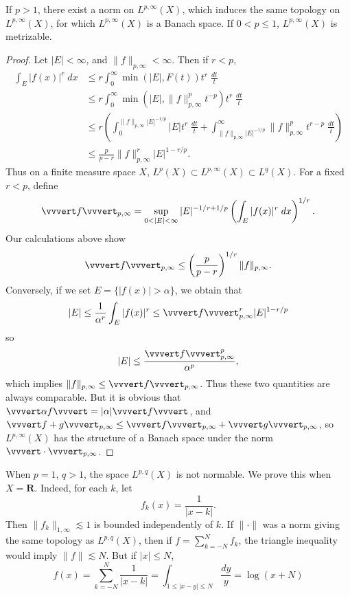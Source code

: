 \begin{theorem}
    If $p > 1$, there exist a norm on $L^{p,\infty}(X)$, which induces the same topology on $L^{p,\infty}(X)$, for which $L^{p,\infty}(X)$ is a Banach space. If $0 < p \leq 1$, $L^{p,\infty}(X)$ is metrizable.
\end{theorem}
\begin{proof}
    Let $|E| < \infty$, and $\| f \|_{p,\infty} < \infty$. Then if $r < p$,
    \begin{align*}
        \int_E |f(x)|^r\; dx &\leq r \int_0^\infty \min(|E|, F(t)) t^r\; \frac{dt}{t}\\
        &\leq r \int_0^\infty \min(|E|, \| f \|_{p,\infty}^p t^{-p} ) t^r\; \frac{dt}{t}\\
        &\leq r \left( \int_0^{\| f \|_{p,\infty} |E|^{-1/p}} |E| t^r\; \frac{dt}{t} + \int_{\| f \|_{p,\infty} |E|^{-1/p}}^\infty \| f \|_{p,\infty}^p t^{r-p}\; \frac{dt}{t} \right)\\
        &\leq \frac{p}{p - r} \| f \|_{p,\infty}^r |E|^{1-r/p}.
    \end{align*}
    Thus on a finite measure space $X$, $L^p(X) \subset L^{p,\infty}(X) \subset L^q(X)$. For a fixed $r < p$, define
    \[ \vvvert f \vvvert_{p,\infty} = \sup_{0 < |E| < \infty} |E|^{-1/r + 1/p} \left( \int_E |f(x)|^r\; dx \right)^{1/r}. \]
    Our calculations above show
    \[ \vvvert f \vvvert_{p,\infty} \leq \left( \frac{p}{p-r} \right)^{1/r} \| f \|_{p,\infty}. \]
    Conversely, if we set $E = \{ |f(x)| > \alpha \}$, we obtain that
    \[ |E| \leq \frac{1}{\alpha^r} \int_E |f(x)|^r \leq \vvvert f \vvvert_{p,\infty}^r |E|^{1 - r/p} \]
    so
    \[ |E| \leq \frac{\vvvert f \vvvert_{p,\infty}^p}{\alpha^p}, \]
    which implies $\| f \|_{p,\infty} \leq \vvvert f \vvvert_{p,\infty}$. Thus these two quantities are always comparable. But it is obvious that $\vvvert \alpha f \vvvert = |\alpha| \vvvert f \vvvert$, and $\vvvert f + g \vvvert_{p,\infty} \leq \vvvert f \vvvert_{p,\infty} + \vvvert g \vvvert_{p,\infty}$, so $L^{p,\infty}(X)$ has the structure of a Banach space under the norm $\vvvert \cdot \vvvert_{p,\infty}$.
\end{proof}

\begin{remark}
    When $p = 1$, $q > 1$, the space $L^{p,q}(X)$ is not normable. We prove this when $X = \mathbf{R}$. Indeed, for each $k$, let
    \[ f_k(x) = \frac{1}{|x - k|}. \]
    Then $\| f_k \|_{1,\infty} \lesssim 1$ is bounded independently of $k$. If $\| \cdot \|$ was a norm giving the same topology as $L^{p,q}(X)$, then if $f = \sum_{k = -N}^N f_k$, the triangle inequality would imply $\| f \| \lesssim N$. But if $|x| \leq N$, 
    \[ f(x) = \sum_{k = -N}^N \frac{1}{|x-k|} = \int_{1 \leq |x-y| \leq N} \frac{dy}{y} = \log(x + N) \]
\end{remark}

